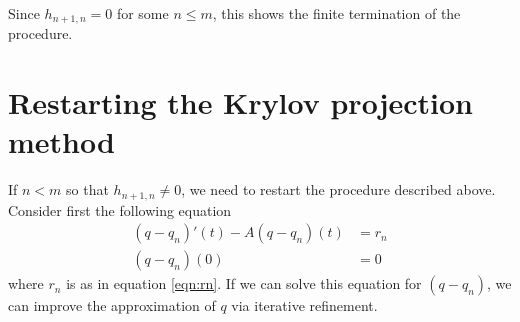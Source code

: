 Since $h_{n+1,n} = 0$ for some $n \leq m$, this shows the finite termination of the procedure.


\section{Restarting the Krylov projection method} \label{sec:rest}
If $n < m$ so that $h_{n+1,n} \neq 0$, we need to restart the procedure described above. Consider first the following equation
\begin{equation}\label{eqn:restkry}
\begin{aligned}
 (q-q_n)'(t) -A (q-q_n)(t) &= r_n \\
(q-q_n)(0)& = 0
\end{aligned}
\end{equation}
where $r_n$ is as in equation \eqref{eqn:rn}. If we can solve this equation for $(q-q_n)$, we can improve the approximation of $q$ via iterative refinement.


